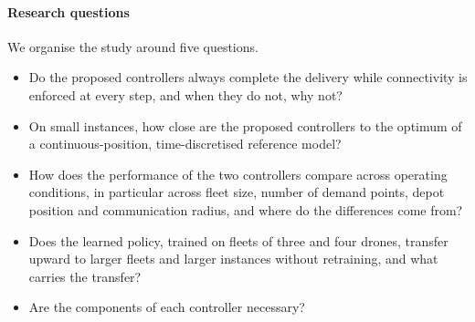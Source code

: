 \documentclass[final,5p,times,twocolumn]{elsarticle}
\begin{document}
\paragraph{Research questions}
We organise the study around five questions.
\begin{itemize}
\item[\textbf{RQ1}] Do the proposed controllers always complete the delivery while connectivity
is enforced at every step, and when they do not, why not?
\item[\textbf{RQ2}] On small instances, how close are the proposed controllers to the optimum of
a continuous-position, time-discretised reference model?
\item[\textbf{RQ3}] How does the performance of the two controllers compare across operating
conditions, in particular across fleet size, number of demand points, depot position and
communication radius, and where do the differences come from?
\item[\textbf{RQ4}] Does the learned policy, trained on fleets of three and four drones, transfer
upward to larger fleets and larger instances without retraining, and what carries the transfer?
\item[\textbf{RQ5}] Are the components of each controller necessary?
\end{itemize}
\end{document}
